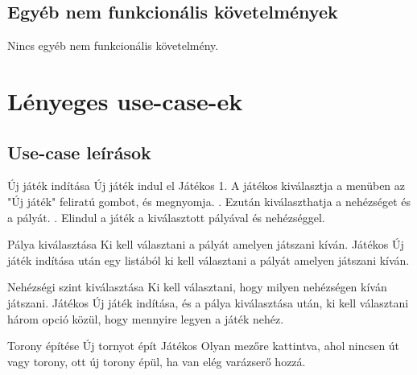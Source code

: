 \subsection{Egyéb nem funkcionális követelmények}

Nincs egyéb nem funkcionális követelmény.



\section{Lényeges use-case-ek}

\subsection{Use-case leírások}

\usecase
{Új játék indítása}
{Új játék indul el}
{Játékos}
{1. A játékos kiválasztja a menüben az "Új játék" feliratú gombot, és megnyomja. . Ezután kiválaszthatja  a nehézséget és a pályát. . Elindul a játék a kiválasztott pályával és nehézséggel.}

\usecase
{Pálya kiválasztása}
{Ki kell választani a pályát amelyen játszani kíván.}
{Játékos}
{Új játék indítása után egy listából ki kell választani a pályát amelyen játszani kíván.}

\usecase
{Nehézségi szint kiválasztása}
{Ki kell választani, hogy milyen nehézségen kíván játszani.}
{Játékos}
{Új játék indítása, és a pálya kiválasztása után, ki kell választani három opció közül,
 hogy mennyire legyen a játék nehéz.}

\usecase
{Torony építése}
{Új tornyot épít}
{Játékos}
{Olyan mezőre kattintva, ahol nincsen út vagy torony, ott új torony épül,
ha van elég varázserő hozzá.}


